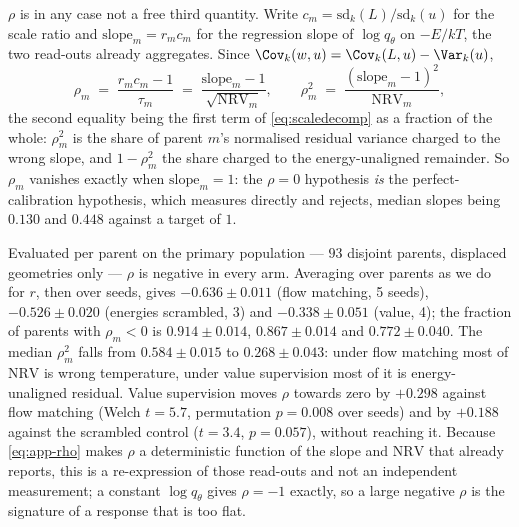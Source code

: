 \begin{remark}
$\rho$ is in any case not a free third quantity. Write
$c_m = \mathrm{sd}_k(L)/\mathrm{sd}_k(u)$ for the scale ratio and
$\mathrm{slope}_m = r_m c_m$ for the regression slope of $\log q_\theta$ on $-E/kT$,
the two read-outs  already aggregates. Since
$\Cov_k(w,u) = \Cov_k(L,u) - \Var_k(u)$,
\begin{equation}
  \rho_m \;=\; \frac{r_m c_m - 1}{\tau_m}
         \;=\; \frac{\mathrm{slope}_m - 1}{\sqrt{\mathrm{NRV}_m}},
  \qquad
  \rho_m^{2} \;=\; \frac{(\mathrm{slope}_m - 1)^2}{\mathrm{NRV}_m},
  \label{eq:app-rho}
\end{equation}
the second equality being the first term of \eqref{eq:scaledecomp} as a fraction of
the whole: $\rho_m^2$ is the share of parent $m$'s normalised residual variance
charged to the wrong slope, and $1 - \rho_m^2$ the share charged to the
energy-unaligned remainder. So $\rho_m$ vanishes exactly when
$\mathrm{slope}_m = 1$: the $\rho = 0$ hypothesis \emph{is} the perfect-calibration
hypothesis, which  measures directly and rejects, median slopes being
$0.130$ and $0.448$ against a target of $1$.

Evaluated per parent on the primary population --- $93$ disjoint parents, displaced
geometries only --- $\rho$ is negative in every arm. Averaging over parents as we do
for $r$, then over seeds, gives $-0.636 \pm 0.011$ (flow matching, 5 seeds),
$-0.526 \pm 0.020$ (energies scrambled, 3) and $-0.338 \pm 0.051$ (value, 4); the
fraction of parents with $\rho_m < 0$ is $0.914 \pm 0.014$, $0.867 \pm 0.014$ and
$0.772 \pm 0.040$. The median $\rho_m^2$ falls from $0.584 \pm 0.015$ to
$0.268 \pm 0.043$: under flow matching most of $\mathrm{NRV}$ is wrong temperature,
under value supervision most of it is energy-unaligned residual. Value supervision
moves $\rho$ towards zero by $+0.298$ against flow matching (Welch $t = 5.7$,
permutation $p = 0.008$ over seeds) and by $+0.188$ against the scrambled control
($t = 3.4$, $p = 0.057$), without reaching it. Because \eqref{eq:app-rho} makes
$\rho$ a deterministic function of the slope and $\mathrm{NRV}$ that
 already reports, this is a re-expression of those read-outs and
not an independent measurement; a constant $\log q_\theta$ gives $\rho = -1$ exactly,
so a large negative $\rho$ is the signature of a response that is too flat.
\end{remark}

